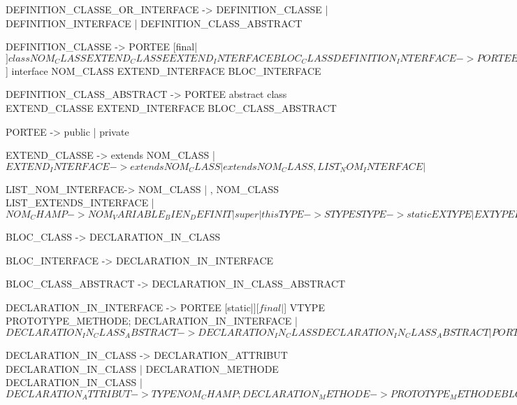 DEFINITION_CLASSE_OR_INTERFACE -> DEFINITION_CLASSE 
								| DEFINITION_INTERFACE 
								| DEFINITION_CLASS_ABSTRACT

DEFINITION_CLASSE ->
	PORTEE [final|$] 
	class NOM_CLASS
	EXTEND_CLASSE EXTEND_INTERFACE
	BLOC_CLASS

DEFINITION_INTERFACE ->
	PORTEE [final|$] interface NOM_CLASS
	EXTEND_INTERFACE
	BLOC_INTERFACE

DEFINITION_CLASS_ABSTRACT ->
	PORTEE abstract class
	EXTEND_CLASSE EXTEND_INTERFACE
	BLOC_CLASS_ABSTRACT


PORTEE -> public | private

EXTEND_CLASSE -> extends NOM_CLASS 
			   | $

EXTEND_INTERFACE -> extends NOM_CLASS 
			      | extends NOM_CLASS , LIST_NOM_INTERFACE 
			      | $

LIST_NOM_INTERFACE-> NOM_CLASS 
				   | , NOM_CLASS LIST_EXTENDS_INTERFACE 
				   | $


NOM_CHAMP -> NOM_VARIABLE_BIEN_DEFINIT 
		   | super 
		   | this

TYPE -> STYPE
STYPE -> static EXTYPE 
	   | EXTYPE
EXTYPE -> final VTYPE 
		| abstract VTYPE 
		| VTYPE
VTYPE -> value CTYPE
	   | CTYPE

CTYPE -> NOM_TYPE 
	   | $

BLOC_CLASS -> { DECLARATION_IN_CLASS }

BLOC_INTERFACE -> {DECLARATION_IN_INTERFACE}

BLOC_CLASS_ABSTRACT -> {DECLARATION_IN_CLASS_ABSTRACT}

DECLARATION_IN_INTERFACE -> 
			PORTEE [static|$] [final|$] VTYPE PROTOTYPE_METHODE; DECLARATION_IN_INTERFACE 
			| $

DECLARATION_IN_CLASS_ABSTRACT ->
						DECLARATION_IN_CLASS DECLARATION_IN_CLASS_ABSTRACT
						| PORTEE abstract VTYPE PROTOTYPE_METHODE; DECLARATION_IN_CLASS_ABSTRACT
						| $


DECLARATION_IN_CLASS ->  DECLARATION_ATTRIBUT  DECLARATION_IN_CLASS 
			 | DECLARATION_METHODE DECLARATION_IN_CLASS
			 | $

DECLARATION_ATTRIBUT -> TYPE NOM_CHAMP;

DECLARATION_METHODE -> PROTOTYPE_METHODE { BLOC_METHODE }
					| PROTOTYPE_CONTRUCTEUR { BLOC_METHODE }

PROTOTYPE_METHODE -> PORTEE TYPE NOM_CHAMP (LIST_PARAM)
PROTOTYPE_CONTRUCTEUR -> PORTEE NOM_CLASS (LIST_PARAM)

PARAM -> VTYPE NOM_CHAMP
LIST_PARAM -> PARAM | PARAM, LIST_PARAM | $


